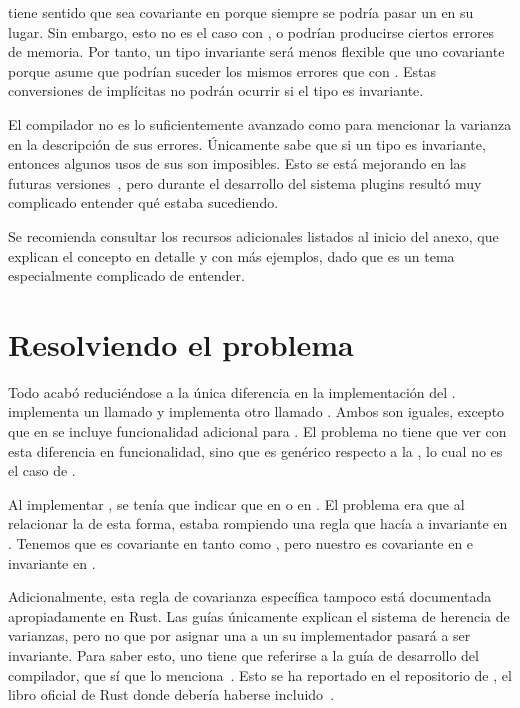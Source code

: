  tiene sentido que sea covariante en  porque
siempre se podría pasar un  en su lugar. Sin embargo, esto no
es el caso con , o podrían producirse ciertos errores de
memoria. Por tanto, un tipo invariante será menos flexible que uno covariante
porque asume que podrían suceder los mismos errores que con .
Estas conversiones de \lifetimes implícitas no podrán ocurrir si el tipo es
invariante.

El compilador no es lo suficientemente avanzado como para mencionar la varianza
en la descripción de sus errores. Únicamente sabe que si un tipo es invariante,
entonces algunos usos de sus \lifetimes son imposibles. Esto se está mejorando
en las futuras versiones~\cite{smarterchecker}, pero durante el desarrollo del
sistema plugins resultó muy complicado entender qué estaba sucediendo.

Se recomienda consultar los recursos adicionales listados al inicio del anexo,
que explican el concepto en detalle y con más ejemplos, dado que es un tema
especialmente complicado de entender.

\section{Resolviendo el problema}

Todo acabó reduciéndose a la única diferencia en la implementación del \trait
{}.  implementa un \trait llamado
 y  implementa otro llamado
. Ambos \traits son iguales, excepto que en 
se incluye funcionalidad adicional para \abistable. El problema no tiene que ver
con esta diferencia en funcionalidad, sino que  es
genérico respecto a la \lifetime {}, lo cual no es el caso de
.

Al implementar , se tenía que indicar que  en
 o  en . El problema era que al
relacionar la \lifetime {} de esta forma, estaba rompiendo una regla que
hacía a  invariante en . Tenemos que  es
covariante en tanto  como , pero nuestro  es
covariante en  e invariante en .

Adicionalmente, esta regla de covarianza específica tampoco está documentada
apropiadamente en Rust. Las guías únicamente explican el sistema de herencia de
varianzas, pero no que por asignar una \lifetime a un \trait su implementador
pasará a ser invariante. Para saber esto, uno tiene que referirse a la guía de
desarrollo del compilador, que sí que lo
menciona~\cite{associated_types_invariance}. Esto se ha reportado en el
repositorio de , el libro oficial de Rust donde debería
haberse incluido~\cite{nomicon_issue}.

